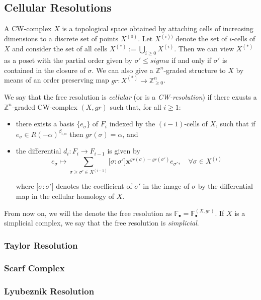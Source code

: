\documentclass[paper=a4, fontsize=11pt]{scrartcl} %
\theoremstyle{plain}
\theoremstyle{definition}
\begin{document}
\subsection{Cellular Resolutions}
A CW-complex $X$ is a topological space obtained by attaching cells of increasing dimensions to a discrete set of points $X^{(0)}$. Let $X^{(i))}$ denote the set of $i$-cells of $X$ and consider the set of all cells $X^{(\ast)} := \bigcup_{i\geq 0} X^{(i)}$. Then we can view $X^{(\ast)}$ as a poset with the partial order given by $\sigma ' \leq sigma$ if and only if $\sigma '$ is contained in the closure of $\sigma$. We can also give a $\mathbb{Z}^n$-graded structure to $X$ by means of an order preserving map $gr: X^{(\ast)} \longrightarrow \mathbb{Z}^{n}_{\geq 0}$.

We say that the free resolution is \textit{cellular} (or is a \textit{CW-resolution}) if there exusts a $\mathbb{Z}^n$-graded CW-complex $(X,gr)$ such that, for all $i \geq 1$:

\begin{itemize}
\item there exists a basis $\lbrace e_{\sigma} \rbrace$ of $F_i$ indexed by the $(i-1)$-cells of $X$, such that if $e_{\sigma} \in R(-\alpha)^{\beta_{i,\alpha}}$ then $gr(\sigma) = \alpha$, and
\item the differential $d_i: F_i \longrightarrow F_{i-1}$ is given by $$e_{\sigma} \mapsto \sum_{\sigma \geq \sigma ' \in X^{(i-1)}} \lbrack \sigma : \sigma' \rbrack \mathbf{x}^{gr(\sigma) - gr(\sigma ')} e_{\sigma '}, \quad \forall \sigma \in X^{(i)}$$

where $\lbrack \sigma : \sigma' \rbrack$ denotes the coefficient of $\sigma '$ in the image of $\sigma$ by the differential map in the cellular homology of $X$.
\end{itemize}

From now on, we will the denote the free resolution as $\mathbb{F}_{\bullet} = \mathbb{F}_{\bullet}^{(X,gr)}$. If $X$ is a simplicial complex, we say that the free resolution is \textit{simplicial}.
\subsubsection{Taylor Resolution}

\subsubsection{Scarf Complex}


\subsubsection{Lyubeznik Resolution}
\end{document}

